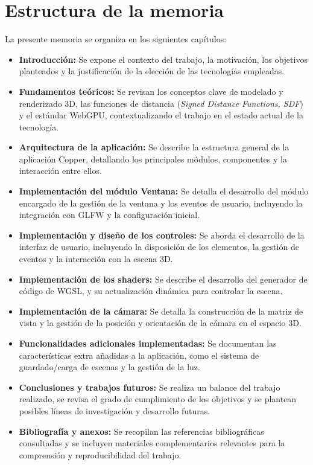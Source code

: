 \section{Estructura de la memoria}

La presente memoria se organiza en los siguientes capítulos:

\begin{itemize}
    \item \textbf{Introducción:} Se expone el contexto del trabajo, la motivación, los objetivos planteados y la justificación de la elección de las tecnologías empleadas.
    \item \textbf{Fundamentos teóricos:} Se revisan los conceptos clave de modelado y renderizado 3D, las funciones de distancia (\textit{Signed Distance Functions, SDF}) y el estándar WebGPU, contextualizando el trabajo en el estado actual de la tecnología.
    \item \textbf{Arquitectura de la aplicación:} Se describe la estructura general de la aplicación Copper, detallando los principales módulos, componentes y la interacción entre ellos.
    \item \textbf{Implementación del módulo Ventana:} Se detalla el desarrollo del módulo encargado de la gestión de la ventana y los eventos de usuario, incluyendo la integración con GLFW y la configuración inicial.
    \item \textbf{Implementación y diseño de los controles:} Se aborda el desarrollo de la interfaz de usuario, incluyendo la disposición de los elementos, la gestión de eventos y la interacción con la escena 3D.
    \item \textbf{Implementación de los shaders:} Se describe el desarrollo del generador de código de WGSL, y su actualización dinámica para controlar la escena.
    \item \textbf{Implementación de la cámara:} Se detalla la construcción de la matriz de vista y la gestión de la posición y orientación de la cámara en el espacio 3D.
    \item \textbf{Funcionalidades adicionales implementadas:} Se documentan las características extra añadidas a la aplicación, como el sistema de guardado/carga de escenas y la gestión de la luz.
    \item \textbf{Conclusiones y trabajos futuros:} Se realiza un balance del trabajo realizado, se revisa el grado de cumplimiento de los objetivos y se plantean posibles líneas de investigación y desarrollo futuras.
    \item \textbf{Bibliografía y anexos:} Se recopilan las referencias bibliográficas consultadas y se incluyen materiales complementarios relevantes para la comprensión y reproducibilidad del trabajo.
\end{itemize}